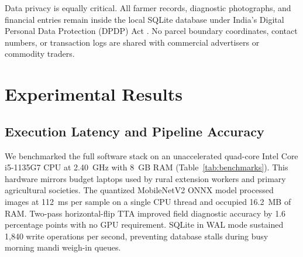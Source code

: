 \documentclass[conference]{IEEEtran}
\begin{document}
Data privacy is equally critical. All farmer records, diagnostic photographs, and financial entries remain inside the local SQLite database under India's Digital Personal Data Protection (DPDP) Act \cite{ref_dpdp}. No parcel boundary coordinates, contact numbers, or transaction logs are shared with commercial advertisers or commodity traders.

\section{Experimental Results}

\subsection{Execution Latency and Pipeline Accuracy}
We benchmarked the full software stack on an unaccelerated quad-core Intel Core i5-1135G7 CPU at 2.40~GHz with 8~GB RAM (Table~\ref{tab:benchmarks}). This hardware mirrors budget laptops used by rural extension workers and primary agricultural societies. The quantized MobileNetV2 ONNX model processed images at 112~ms per sample on a single CPU thread and occupied 16.2~MB of RAM. Two-pass horizontal-flip TTA improved field diagnostic accuracy by 1.6 percentage points with no GPU requirement. SQLite in WAL mode sustained 1,840 write operations per second, preventing database stalls during busy morning mandi weigh-in queues.

\begin{table}[htbp]
\caption{System Performance Across Pipeline Modules}
\label{tab:benchmarks}
\centering
{}
\end{table}
\end{document}
